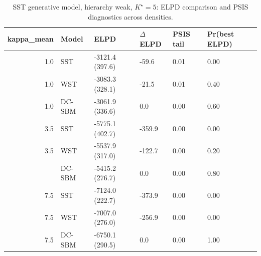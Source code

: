 \begin{table}
\centering
\caption{SST generative model, hierarchy weak, $K^\star=5$: ELPD comparison and PSIS diagnostics across densities.}
\centering
\begin{tabular}[t]{rlllll}
\toprule
kappa_mean & Model & ELPD & $\Delta$ELPD & PSIS tail & Pr(best ELPD)\\
\midrule
1.0 & SST & -3121.4 (397.6) & -59.6 & 0.01 & 0.00\\
1.0 & WST & -3083.3 (328.1) & -21.5 & 0.01 & 0.40\\
1.0 & DC-SBM & -3061.9 (336.6) & 0.0 & 0.00 & 0.60\\
3.5 & SST & -5775.1 (402.7) & -359.9 & 0.00 & 0.00\\
3.5 & WST & -5537.9 (317.0) & -122.7 & 0.00 & 0.20\\
\addlinespace
3.5 & DC-SBM & -5415.2 (276.7) & 0.0 & 0.00 & 0.80\\
7.5 & SST & -7124.0 (222.7) & -373.9 & 0.00 & 0.00\\
7.5 & WST & -7007.0 (276.0) & -256.9 & 0.00 & 0.00\\
7.5 & DC-SBM & -6750.1 (290.5) & 0.0 & 0.00 & 1.00\\
\bottomrule
\end{tabular}
\end{table}
